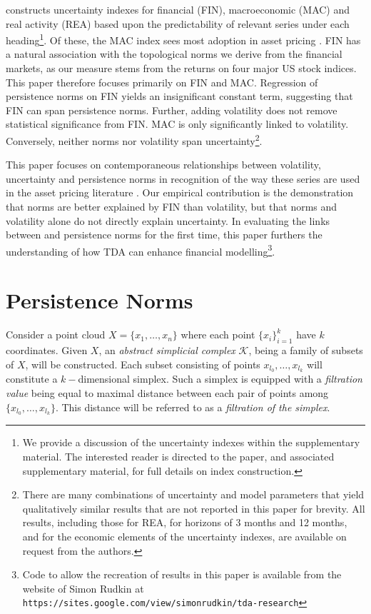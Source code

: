 \documentclass{article}
\begin{document}
\cite{jurado2015measuring} constructs uncertainty indexes for financial (FIN), macroeconomic (MAC) and real activity (REA) based upon the predictability of relevant series under each heading\footnote{We provide a discussion of the \cite{jurado2015measuring} uncertainty indexes within the supplementary material. The interested reader is directed to the \cite{jurado2015measuring} paper, and associated supplementary material, for full details on index construction.}. Of these, the MAC index sees most adoption in asset pricing \citep{bali2017economic,bali2021macroeconomic}. FIN has a natural association with the topological norms we derive from the financial markets, as our measure stems from the returns on four major US stock indices. This paper therefore focuses primarily on FIN and MAC. Regression of persistence norms on FIN yields an insignificant constant term, suggesting that FIN can span persistence norms. Further, adding volatility does not remove statistical significance from FIN. MAC is only significantly linked to volatility. Conversely, neither norms nor volatility span uncertainty\footnote{There are many combinations of uncertainty and model parameters that yield qualitatively similar results that are not reported in this paper for brevity. All results, including those for REA, for horizons of 3 months and 12 months, and for the economic elements of the uncertainty indexes, are available on request from the authors.}. 

This paper focuses on contemporaneous relationships between volatility, uncertainty and persistence norms in recognition of the way these series are used in the asset pricing literature \citep{ang2006cross,bali2017economic,bali2021macroeconomic}. Our empirical contribution is the demonstration that norms are better explained by FIN than volatility, but that norms and volatility alone do not directly explain uncertainty. In evaluating the links between \cite{jurado2015measuring} and persistence norms for the first time, this paper furthers the understanding of how TDA can enhance financial modelling\footnote{Code to allow the recreation of results in this paper is available from the website of Simon Rudkin at \texttt{https://sites.google.com/view/simonrudkin/tda-research}}.

\section{Persistence Norms}
Consider a point cloud $X = \{x_1,\ldots,x_n\}$ where each point $\{x_i\}_{i=1}^k$ have $k$ coordinates. Given $X$, an \emph{abstract simplicial complex} $\mathcal{K}$, being a family of subsets of $X$, will be constructed. Each subset consisting of points $x_{l_0},\ldots,x_{l_k}$ will constitute a $k-$dimensional simplex. Such a simplex is equipped with a \emph{filtration value} being equal to maximal distance between each pair of points among $\{x_{l_0},\ldots,x_{l_k}\}$. This distance will be referred to as a \emph{filtration of the simplex}.
\end{document}
